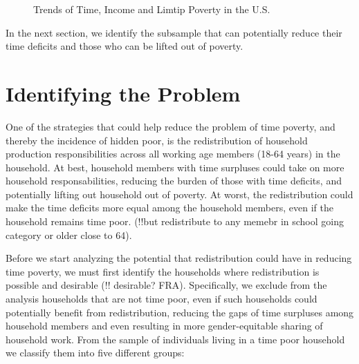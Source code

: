 \documentclass[
  11pt,
]{article}
\begin{document}
\begin{figure}


\caption{\label{fig-trend}Trends of Time, Income and Limtip Poverty in
the U.S.}

\end{figure}%

In the next section, we identify the subsample that can potentially
reduce their time deficits and those who can be lifted out of poverty.

\section{Identifying the Problem}\label{sec-problem}

One of the strategies that could help reduce the problem of time
poverty, and thereby the incidence of hidden poor, is the redistribution
of household production responsibilities across all working age members
(18-64 years) in the household. At best, household members with time
surpluses could take on more household responsabilities, reducing the
burden of those with time deficits, and potentially lifting out
household out of poverty. At worst, the redistribution could make the
time deficits more equal among the household members, even if the
household remains time poor. (!!but redistribute to any memebr in school
going category or older close to 64).

Before we start analyzing the potential that redistribution could have
in reducing time poverty, we must first identify the households where
redistribution is possible and desirable (!! desirable? FRA).
Specifically, we exclude from the analysis households that are not time
poor, even if such households could potentially benefit from
redistribution, reducing the gaps of time surpluses among household
members and even resulting in more gender-equitable sharing of household
work. From the sample of individuals living in a time poor household we
classify them into five different groups:
\end{document}
